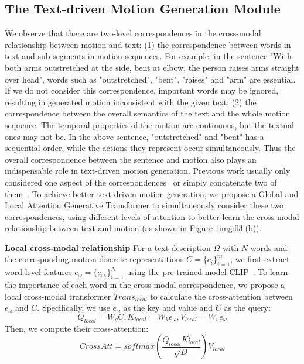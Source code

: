 \documentclass[10pt,twocolumn,letterpaper]{article}
\begin{document}
\subsection{The Text-driven Motion Generation Module}
We observe that there are two-level correspondences in the cross-modal relationship between motion and text: (1) the correspondence between words in text and sub-segments in motion sequences. For example, in the sentence "With both arms outstretched at the side, bent at elbow, the person raises arms straight over head", words such as "outstretched", "bent", "raises" and "arm" are essential. If we do not consider this correspondence, important words may be ignored, resulting in generated motion inconsistent with the given text; (2) the correspondence between the overall semantics of the text and the whole motion sequence. The temporal properties of the motion are continuous, but the textual ones may not be. In the above sentence, "outstretched" and "bent" has a sequential order, while the actions they represent occur simultaneously. Thus the overall correspondence between the sentence and motion also plays an indispensable role in text-driven motion generation. Previous work usually only considered one aspect of the correspondences~\cite{zhang2022motiondiffuse,tevet2023human,petrovich2022temos,zhang2023t2m,chen2023mld} or simply concatenate two of them~\cite{guo2022generating}. To achieve better text-driven motion generation, we propose a Global and Local Attention Generative Transformer to simultaneously consider these two correspondences, using different levels of attention to better learn the cross-modal relationship between text and motion (as shown in Figure~\ref{img:03}(b)).


\textbf{Local cross-modal relationship}\quad
For a text description $\Omega$ with $N$ words and the corresponding motion discrete representations $C=\{c_i\}_{i=1}^m$, we first extract word-level features $e_\omega = \{e_{\omega_i}\}_{i=1}^N$ using the pre-trained model CLIP~\cite{radford2021learning}. To learn the importance of each word in the cross-modal correspondence, we propose a local cross-modal transformer $ {Trans_{local}}$ to calculate the cross-attention between $e_\omega$ and $C$. Specifically, we use $e_\omega$ as the key and value and $C$ as the query:
\begin{equation}
Q_{local}=W_q C,K_{local}=W_ke_\omega,V_{local}=W_ve_\omega
\label{euqa:06}
\end{equation}
Then, we compute their cross-attention:
\begin{equation}
CrossAtt = softmax(\frac{Q_{local}K_{local}^T }{\sqrt{D}})V_{local}
\label{euqa:07}
\end{equation}
\end{document}
